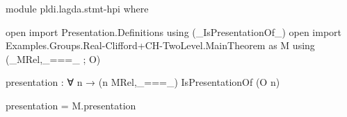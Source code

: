 \begin{code}[hide]
module pldi.lagda.stmt-hpi where

open import Presentation.Definitions using (_IsPresentationOf_)
open import Examples.Groups.Real-Clifford+CH-TwoLevel.MainTheorem as M
  using (_MRel,_===_ ; O)
\end{code}
\begin{code}[number=agda:hpi]
presentation : ∀ n → (n MRel,_===_) IsPresentationOf (O n)
\end{code}
\begin{code}[hide]
presentation = M.presentation
\end{code}
